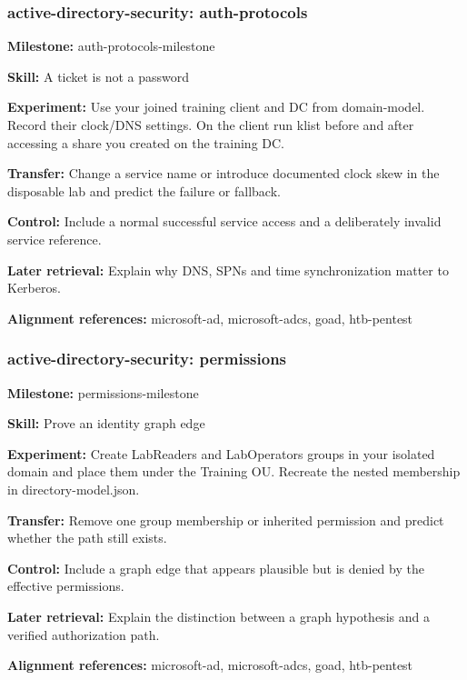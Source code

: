 \subsubsection{active-directory-security: auth-protocols}
\noindent\textbf{Milestone:} auth-protocols-milestone\par
\noindent\textbf{Skill:} A ticket is not a password\par
\noindent\textbf{Experiment:} Use your joined training client and DC from domain-model. Record their clock/DNS settings. On the client run klist before and after accessing a share you created on the training DC.\par
\noindent\textbf{Transfer:} Change a service name or introduce documented clock skew in the disposable lab and predict the failure or fallback.\par
\noindent\textbf{Control:} Include a normal successful service access and a deliberately invalid service reference.\par
\noindent\textbf{Later retrieval:} Explain why DNS, SPNs and time synchronization matter to Kerberos.\par
\noindent\textbf{Alignment references:} microsoft-ad, microsoft-adcs, goad, htb-pentest\par
\subsubsection{active-directory-security: permissions}
\noindent\textbf{Milestone:} permissions-milestone\par
\noindent\textbf{Skill:} Prove an identity graph edge\par
\noindent\textbf{Experiment:} Create LabReaders and LabOperators groups in your isolated domain and place them under the Training OU. Recreate the nested membership in directory-model.json.\par
\noindent\textbf{Transfer:} Remove one group membership or inherited permission and predict whether the path still exists.\par
\noindent\textbf{Control:} Include a graph edge that appears plausible but is denied by the effective permissions.\par
\noindent\textbf{Later retrieval:} Explain the distinction between a graph hypothesis and a verified authorization path.\par
\noindent\textbf{Alignment references:} microsoft-ad, microsoft-adcs, goad, htb-pentest\par
